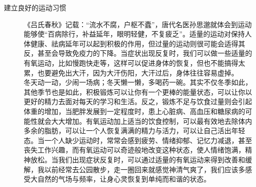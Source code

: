 \documentclass{ctexart}
\begin{document}
\begin{description}
    \item[建立良好的运动习惯] 《吕氏春秋》记载：“流水不腐，户枢不蠹”，唐代名医孙思邈就体会到运动能够使“百病除行，补益延年，眼明轻健，不复疲乏”。适量的运动对保持人体健康、祛病延年可以起到积极的作用，但过量的运动则很可能会适得其反，甚至会导致免疫力的下降。当症状出现反复时，我们可以做一些适量的有氧运动，比如慢跑快走等，这样可以促进身体的恢复，但也不能搞得太累，也要避免出大汗，因为大汗伤阳，大汗过后，身体往往容易虚掉。\\ 冬天动一动，少闹一场病；冬天懒一懒，多喝药一碗。其实不仅冬季如此，其他季节也是如此，积极锻炼可以让你有一个更棒的能量状态，可以让你以更好的精力去面对每天的学习和生活。反之，锻炼不足与饮食过量则会引起体重的增加，当肥胖发展到一定程度时，患上心脏病、高血压和糖尿病的可能性就会大大增加。有氧运动加上适当的饮食控制，可以最有效地去除体内多余的脂肪，可以让一个人恢复满满的精力与活力，可以让自己活出年轻态。当一个人缺少运动时，常常会感到疲劳、情绪抑郁、记忆力减退，甚至丧失工作兴趣，而有氧运动可以奇迹般地改变这种状态，使人情绪饱满，精神放松。当我们出现症状反复时，可以通过适量的有氧运动来得到改善和缓解，我以前经常去公园散步，走一圈回来就感觉神清气爽了，我们应该多感受大自然的气场与频率，让身心灵恢复到单纯而和谐的状态。

\end{description}
\end{document}
